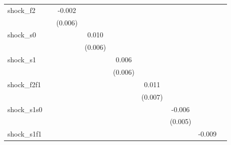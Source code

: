 {\begin{tabular}{l*{8}{c}}
\addlinespace
shock\_f2    &                     &      -0.002         &                     &                     &                     &                     &                     &                     \\
            &                     &     (0.006)         &                     &                     &                     &                     &                     &                     \\
\addlinespace
shock\_s0    &                     &                     &       0.010\sym{*}  &                     &                     &                     &                     &                     \\
            &                     &                     &     (0.006)         &                     &                     &                     &                     &                     \\
\addlinespace
shock\_s1    &                     &                     &                     &       0.006         &                     &                     &                     &                     \\
            &                     &                     &                     &     (0.006)         &                     &                     &                     &                     \\
\addlinespace
shock\_f2f1  &                     &                     &                     &                     &       0.011         &                     &                     &                     \\
            &                     &                     &                     &                     &     (0.007)         &                     &                     &                     \\
\addlinespace
shock\_s1s0  &                     &                     &                     &                     &                     &      -0.006         &                     &                     \\
            &                     &                     &                     &                     &                     &     (0.005)         &                     &                     \\
\addlinespace
shock\_s1f1  &                     &                     &                     &                     &                     &                     &      -0.009         &                     \\

\end{tabular}}
